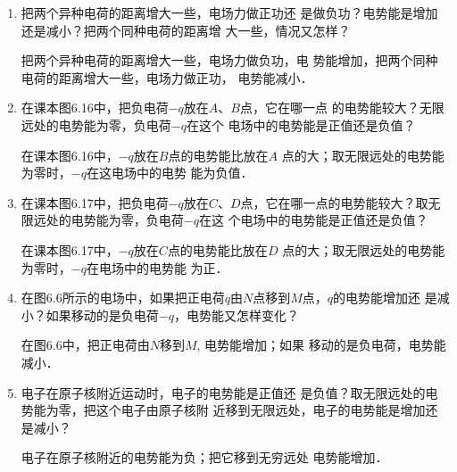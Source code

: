 \begin{enumerate}
	\item 把两个异种电荷的距离增大一些，电场力做正功还
是做负功？电势能是增加还是减小？把两个同种电荷的距离增
大一些，情况又怎样？

\begin{solution}
    把两个异种电荷的距离增大一些，电场力做负功，电
    势能增加，把两个同种电荷的距离增大一些，电场力做正功，
    电势能减小．
\end{solution}

\item 在课本图6.16中，把负电荷$-q$放在$A$、$B$点，它在哪一点
的电势能较大？无限远处的电势能为零，负电荷$-q$在这个
电场中的电势能是正值还是负值？

\begin{solution}
    在课本图6.16中，$-q$放在$B$点的电势能比放在$A$
    点的大；取无限远处的电势能为零时，$-q$在这电场中的电势
    能为负值．
\end{solution}

\item 在课本图6.17中，把负电荷$-q$放在$C$、$D$点，它在哪一点的电势能较大？取无限远处的电势能为零，负电荷$-q$在这
个电场中的电势能是正值还是负值？

\begin{solution}
    在课本图6.17中，$-q$放在$C$点的电势能比放在$D$
    点的大；取无限远处的电势能为零时，$-q$在电场中的电势能
    为正．
\end{solution}

\item 在图6.6所示的电场中，如果把正电荷$q$由$N$点移到$M$点，$q$的电势能增加还
是减小？如果移动的是负电荷$-q$，电势能又怎样变化？
\begin{figure}[htp]\centering

    \caption{}
\end{figure}	


\begin{solution}
    在图6.6中，把正电荷由$N$移到$M$, 电势能增加；如果
    移动的是负电荷，电势能减小．
\end{solution}

\item  电子在原子核附近运动时，电子的电势能是正值还
是负值？取无限远处的电势能为零，把这个电子由原子核附
近移到无限远处，电子的电势能是增加还是减小？

\begin{solution}
    电子在原子核附近的电势能为负；把它移到无穷远处
    电势能增加．
\end{solution}

\end{enumerate}




